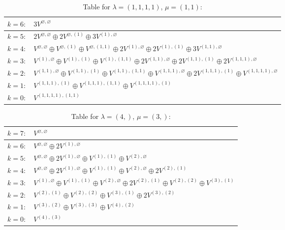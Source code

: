 \documentclass[a4paper,12pt]{article}
\begin{document}
\renewcommand{\arraystretch}{1.6} 
\begin{table}[H]
\centering
\caption{Table for $\lambda = (1, 1, 1, 1)$, $\mu = (1, 1)$:}
\begin{tabular}{|>{\centering\arraybackslash}p{15cm}|}
\hline
 $k = 6: \quad 3 V^{\varnothing, \varnothing} $ \\ \hline
 $k = 5: \quad 2 V^{\varnothing, \varnothing} \oplus 2 V^{\varnothing, (1)} \oplus 3 V^{(1), \varnothing} $ \\ \hline
 $k = 4: \quad V^{\varnothing, \varnothing} \oplus V^{\varnothing, (1)} \oplus V^{\varnothing, (1, 1)} \oplus 2 V^{(1), \varnothing} \oplus 2 V^{(1), (1)} \oplus 3 V^{(1, 1), \varnothing} $ \\ \hline
 $k = 3: \quad V^{(1), \varnothing} \oplus V^{(1), (1)} \oplus V^{(1), (1, 1)} \oplus 2 V^{(1, 1), \varnothing} \oplus 2 V^{(1, 1), (1)} \oplus 2 V^{(1, 1, 1), \varnothing} $ \\ \hline
 $k = 2: \quad V^{(1, 1), \varnothing} \oplus V^{(1, 1), (1)} \oplus V^{(1, 1), (1, 1)} \oplus V^{(1, 1, 1), \varnothing} \oplus 2 V^{(1, 1, 1), (1)} \oplus V^{(1, 1, 1, 1), \varnothing} $ \\ \hline
 $k = 1: \quad V^{(1, 1, 1), (1)} \oplus V^{(1, 1, 1), (1, 1)} \oplus V^{(1, 1, 1, 1), (1)} $ \\ \hline
 $k = 0: \quad V^{(1, 1, 1, 1), (1, 1)} $ \\ \hline
\end{tabular}
\end{table}

\renewcommand{\arraystretch}{1.6} 
\begin{table}[H]
\centering
\caption{Table for $\lambda = (4,)$, $\mu = (3,)$:}
\begin{tabular}{|>{\centering\arraybackslash}p{15cm}|}
\hline
 $k = 7: \quad V^{\varnothing, \varnothing} $ \\ \hline
 $k = 6: \quad V^{\varnothing, \varnothing} \oplus 2 V^{(1), \varnothing} $ \\ \hline
 $k = 5: \quad V^{\varnothing, \varnothing} \oplus 2 V^{(1), \varnothing} \oplus V^{(1), (1)} \oplus V^{(2), \varnothing} $ \\ \hline
 $k = 4: \quad V^{\varnothing, \varnothing} \oplus 2 V^{(1), \varnothing} \oplus V^{(1), (1)} \oplus V^{(2), \varnothing} \oplus 2 V^{(2), (1)} $ \\ \hline
 $k = 3: \quad V^{(1), \varnothing} \oplus V^{(1), (1)} \oplus V^{(2), \varnothing} \oplus 2 V^{(2), (1)} \oplus V^{(2), (2)} \oplus V^{(3), (1)} $ \\ \hline
 $k = 2: \quad V^{(2), (1)} \oplus V^{(2), (2)} \oplus V^{(3), (1)} \oplus 2 V^{(3), (2)} $ \\ \hline
 $k = 1: \quad V^{(3), (2)} \oplus V^{(3), (3)} \oplus V^{(4), (2)} $ \\ \hline
 $k = 0: \quad V^{(4), (3)} $ \\ \hline
\end{tabular}
\end{table}
\end{document}
